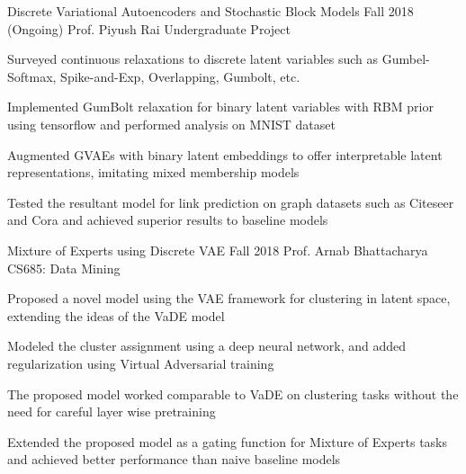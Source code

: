
\begin{cventries}

	\cventry
	{Discrete Variational Autoencoders and Stochastic Block Models}
	{}
	{Fall 2018 (Ongoing)}
	{Prof. Piyush Rai}
	{Undergraduate Project}
	{
		\begin{cvitems}
		\item Surveyed continuous relaxations to discrete latent variables such as Gumbel-Softmax, Spike-and-Exp, Overlapping, Gumbolt, etc.
		\item Implemented GumBolt relaxation for binary latent variables with RBM prior using tensorflow and performed analysis on MNIST dataset
		\item Augmented GVAEs with binary latent embeddings to offer interpretable latent representations, imitating mixed membership models
		\item Tested the resultant model for link prediction on graph datasets such as Citeseer and Cora and achieved superior results to baseline models
		\end{cvitems}
	}

	\cventry
	{Mixture of Experts using Discrete VAE}
	{}
	{Fall 2018}
	{Prof. Arnab Bhattacharya}
	{CS685: Data Mining}
	{
		\begin{cvitems}
		\item Proposed a novel model using the VAE framework for clustering in latent space, extending the ideas of the VaDE model
		\item Modeled the cluster assignment using a deep neural network, and added regularization using Virtual Adversarial training
		\item The proposed model worked comparable to VaDE on clustering tasks without the need for careful layer wise pretraining
		\item Extended the proposed model as a gating function for Mixture of Experts tasks and achieved better performance than naive baseline models
		\end{cvitems}
	}


\end{cventries}
